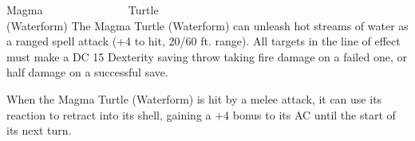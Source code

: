 \documentclass[letterpaper,openany,twoside,twocolumn]{book}
\begin{document}
\begin{DndMonster}[width=0.5\textwidth]{Magma ~~~~~~~~~~~~~~ Turtle\\(Waterform)}
	The Magma Turtle (Waterform) can unleash hot streams of water as a ranged spell attack (+4 to hit, 20/60 ft. range). All targets in the line of effect must make a DC 15 Dexterity saving throw taking  fire damage on a failed one, or half damage on a successful save.
    
    
    When the Magma Turtle (Waterform) is hit by a melee attack, it can use its reaction to retract into its shell, gaining a +4 bonus to its AC until the start of its next turn.
      
\end{DndMonster}

\vfill\eject %
\end{document}
